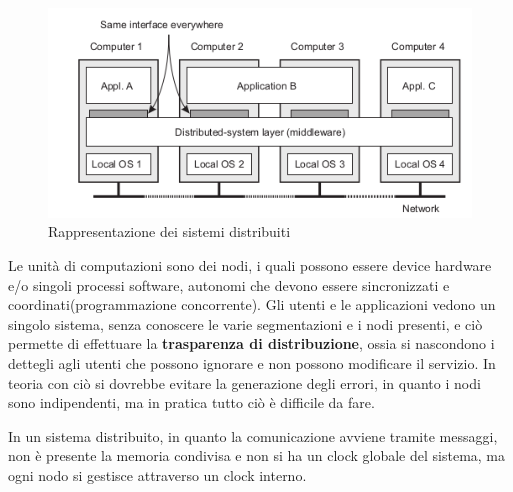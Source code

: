 \documentclass[a4paper,12pt, oneside]{book}
\begin{document}
\begin{figure}
    \caption{Rappresentazione dei sistemi distribuiti}
	\includegraphics[scale=2.5]{img/cli.png}
\end{figure}
Le unità di computazioni sono dei nodi, i quali possono essere device hardware e/o singoli processi software,
autonomi che devono essere sincronizzati e coordinati(programmazione concorrente).\newline
Gli utenti e le applicazioni vedono un singolo sistema, senza conoscere le varie segmentazioni 
e i nodi presenti, e ciò permette di effettuare la \textbf{trasparenza di distribuzione}, 
ossia si nascondono i dettegli agli utenti che possono ignorare e non possono modificare il servizio.\newline 
In teoria con ciò si dovrebbe evitare la generazione degli errori, in quanto i nodi sono
indipendenti, ma in pratica tutto ciò è difficile da fare.

In un sistema distribuito, in quanto la comunicazione avviene tramite messaggi, non è presente la memoria
condivisa e non si ha un clock globale del sistema, ma ogni nodo si gestisce attraverso un clock interno.
\end{document}
